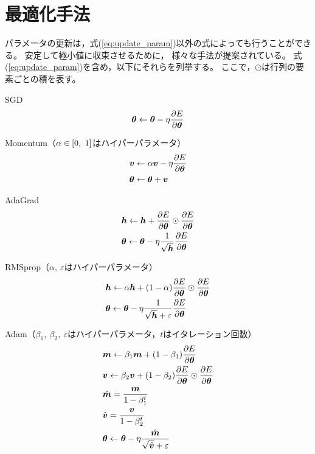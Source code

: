 \documentclass[class=jsarticle, crop=false, dvipdfmx, fleqn]{standalone}
\begin{document}


\section{最適化手法}

パラメータの更新は，式(\ref{eq:update_param})以外の式によっても行うことができる。
安定して極小値に収束させるために，
様々な手法が提案されている。
式(\ref{eq:update_param})を含め，以下にそれらを列挙する。
ここで，$\odot$は行列の要素ごとの積を表す。

SGD
\begin{equation}
\bm{\theta} \leftarrow \bm{\theta} - \eta \pdv{E}{\bm{\theta}}
\end{equation}

Momentum（$\alpha \in \qty[0,\ 1]$はハイパーパラメータ）
\begin{align}
& \bm{v} \leftarrow \alpha \bm{v} - \eta \pdv{E}{\bm{\theta}} \\
& \bm{\theta} \leftarrow \bm{\theta} + \bm{v}
\end{align}

AdaGrad
\begin{align}
& \bm{h} \leftarrow \bm{h} + \pdv{E}{\bm{\theta}} \odot \pdv{E}{\bm{\theta}} \\
& \bm{\theta} \leftarrow \bm{\theta} - \eta \frac{1}{\sqrt{\bm{h}}} \pdv{E}{\bm{\theta}}
\end{align}

RMSprop（$\alpha,\ \varepsilon$はハイパーパラメータ）
\begin{align}
& \bm{h} \leftarrow \alpha \bm{h} + (1 - \alpha) \pdv{E}{\bm{\theta}} \odot \pdv{E}{\bm{\theta}} \\
& \bm{\theta} \leftarrow \bm{\theta} - \eta \frac{1}{\sqrt{\bm{h}} + \varepsilon} \pdv{E}{\bm{\theta}}
\end{align}

Adam（$\beta_1,\ \beta_2,\ \varepsilon$はハイパーパラメータ，$t$はイタレーション回数）
\begin{align}
& \bm{m} \leftarrow \beta_1 \bm{m} + (1 - \beta_1) \pdv{E}{\bm{\theta}} \\
& \bm{v} \leftarrow \beta_2 \bm{v} + (1 - \beta_2) \pdv{E}{\bm{\theta}} \odot \pdv{E}{\bm{\theta}} \\
& \hat{\bm{m}} = \frac{\bm{m}}{1 - \beta_1^t} \\
& \hat{\bm{v}} = \frac{\bm{v}}{1 - \beta_2^t} \\
& \bm{\theta} \leftarrow \bm{\theta} - \eta \frac{\hat{\bm{m}}}{\sqrt{\hat{\bm{v}}} + \varepsilon}
\end{align}
\end{document}
